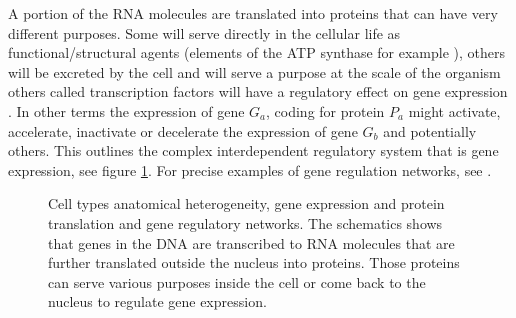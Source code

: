 	A portion of the RNA molecules are translated into proteins that can have very different purposes. Some will serve directly in the cellular life as functional/structural agents (elements of the ATP synthase for example \cite{boyer97}), others will be excreted by the cell and will serve a purpose at the scale of the organism \cite{kaiser84} others called transcription factors will have a regulatory effect on gene expression \cite{mitchell89}. In other terms the expression of gene $G_a$, coding for protein $P_a$ might activate, accelerate, inactivate or decelerate the expression of gene $G_b$ and potentially others. This outlines the complex interdependent regulatory system that is gene expression, see figure \ref{fig:cells}. For precise examples of gene regulation networks, see \cite{gossen92, shinozaki03,fuqua01,balmer02}.\\
	
\begin{figure}[bth]
        \myfloatalign
         \quad
        \caption{Cell types anatomical heterogeneity, gene expression and protein translation and gene regulatory networks. The schematics shows that genes in the DNA are transcribed to RNA molecules that are further translated outside the nucleus into proteins. Those proteins can serve various purposes inside the cell or come back to the nucleus to regulate gene expression.}\label{fig:cells}
\end{figure}
	
